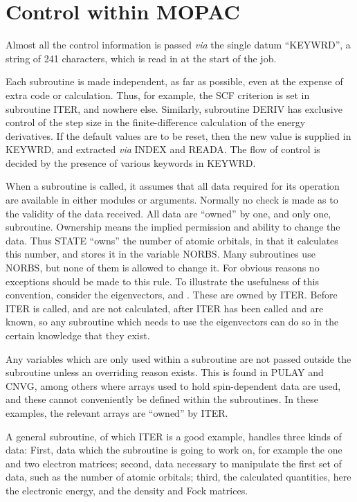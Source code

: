 \section{Control within MOPAC}
Almost all the control information is passed {\em via} the  single  datum
``KEYWRD'',  a  string  of 241 characters, which is read in at the start
of the job.

Each subroutine is made independent, as far as  possible,  even  at the
expense  of  extra code or calculation.  Thus, for example, the SCF
 criterion is set in  subroutine
ITER,  and  nowhere  else.   Similarly, subroutine  DERIV  has  exclusive
control  of  the  step  size  in  the finite-difference calculation of the
energy derivatives.  If the default values  are  to  be reset, then the new
value is supplied in KEYWRD, and 
extracted {\em via} INDEX and READA.  The flow of control is  decided  by
the presence of various keywords in KEYWRD.

When a subroutine is called, it assumes that all data required  for its
operation  are  available  in  either  modules or arguments. Normally no
check is made as to the validity of the data received.   All data  are
``owned'' by one, and only one, subroutine.  Ownership means the 
implied permission and ability to change the data.  Thus  STATE  ``owns'' the
number  of  atomic orbitals, in that it calculates this number, and
 stores it in the variable NORBS.  Many subroutines use NORBS,
but  none of  them  is  allowed  to  change it.  For obvious reasons no
exceptions should be made to this rule.   To  illustrate  the  usefulness  of
this convention,  consider the eigenvectors,  and .  These
are owned by ITER.  Before ITER is called,  and  are not
calculated, after ITER has  been called  and  are known, so
any subroutine  which needs to use the eigenvectors can do so in the certain
knowledge that they exist.

Any variables which are only  used  within  a  subroutine  are  not passed
outside the subroutine unless an overriding reason exists.  This
 is found in PULAY and CNVG, among  others  where
arrays  used  to  hold spin-dependent  data  are used, and these cannot
conveniently be defined within the subroutines.  In these  examples,  the
relevant  arrays  are ``owned'' by ITER.

A general subroutine, of which ITER  is  a  good  example,  handles three
kinds of data:  First, data which the subroutine is going to work on, for
example  the  one  and  two  electron  matrices;  second,  data necessary  to
manipulate  the  first set of data, such as the number of atomic orbitals;
third, the calculated quantities, here  the  electronic energy, and the density
and Fock matrices.

